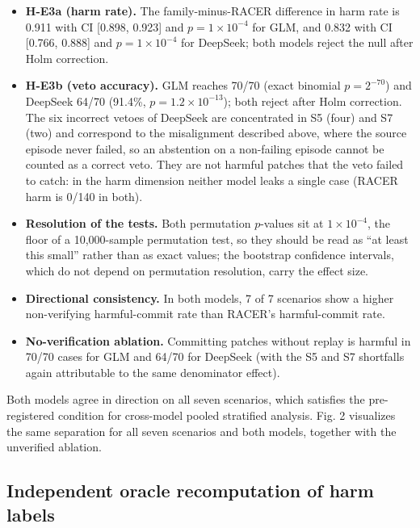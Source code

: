 \documentclass[review]{fcs}
\begin{document}
\begin{itemize}

  \item \textbf{H-E3a (harm rate).} The family-minus-RACER difference in harm rate is 0.911 with CI [0.898, 0.923] and $p = 1\times10^{-4}$ for GLM, and 0.832 with CI [0.766, 0.888] and $p = 1\times10^{-4}$ for DeepSeek; both models reject the null after Holm correction.

  \item \textbf{H-E3b (veto accuracy).} GLM reaches 70/70 (exact binomial $p = 2^{-70}$) and DeepSeek 64/70 (91.4\%, $p = 1.2\times10^{-13}$); both reject after Holm correction. The six incorrect vetoes of DeepSeek are concentrated in S5 (four) and S7 (two) and correspond to the misalignment described above, where the source episode never failed, so an abstention on a non-failing episode cannot be counted as a correct veto. They are not harmful patches that the veto failed to catch: in the harm dimension neither model leaks a single case (RACER harm is 0/140 in both).

  \item \textbf{Resolution of the tests.} Both permutation $p$-values sit at $1\times10^{-4}$, the floor of a 10,000-sample permutation test, so they should be read as ``at least this small'' rather than as exact values; the bootstrap confidence intervals, which do not depend on permutation resolution, carry the effect size.

  \item \textbf{Directional consistency.} In both models, 7 of 7 scenarios show a higher non-verifying harmful-commit rate than RACER's harmful-commit rate.

  \item \textbf{No-verification ablation.} Committing patches without replay is harmful in 70/70 cases for GLM and 64/70 for DeepSeek (with the S5 and S7 shortfalls again attributable to the same denominator effect).

\end{itemize}

Both models agree in direction on all seven scenarios, which satisfies the pre-registered condition for cross-model pooled stratified analysis. Fig. 2 visualizes the same separation for all seven scenarios and both models, together with the unverified ablation.

\subsection{Independent oracle recomputation of harm labels}
\end{document}
